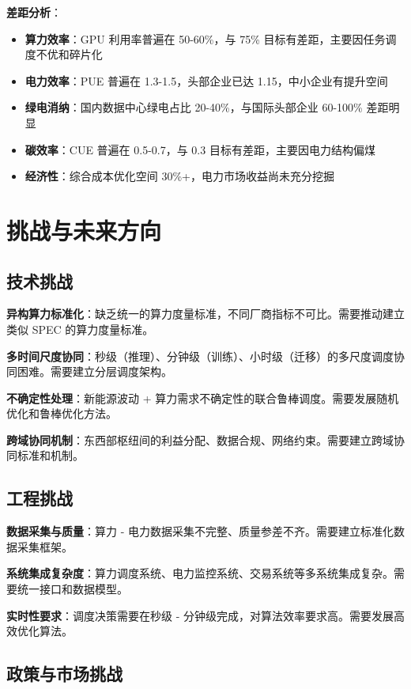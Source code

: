\documentclass[12pt,a4paper]{article}
\begin{document}
\textbf{差距分析}：
\begin{itemize}
    \item \textbf{算力效率}：GPU 利用率普遍在 50-60\%，与 75\% 目标有差距，主要因任务调度不优和碎片化
    \item \textbf{电力效率}：PUE 普遍在 1.3-1.5，头部企业已达 1.15，中小企业有提升空间
    \item \textbf{绿电消纳}：国内数据中心绿电占比 20-40\%，与国际头部企业 60-100\% 差距明显
    \item \textbf{碳效率}：CUE 普遍在 0.5-0.7，与 0.3 目标有差距，主要因电力结构偏煤
    \item \textbf{经济性}：综合成本优化空间 30\%+，电力市场收益尚未充分挖掘
\end{itemize}

\section{挑战与未来方向}
\label{sec:challenge}

\subsection{技术挑战}

\textbf{异构算力标准化}：缺乏统一的算力度量标准，不同厂商指标不可比。需要推动建立类似 SPEC 的算力度量标准。

\textbf{多时间尺度协同}：秒级（推理）、分钟级（训练）、小时级（迁移）的多尺度调度协同困难。需要建立分层调度架构。

\textbf{不确定性处理}：新能源波动 + 算力需求不确定性的联合鲁棒调度。需要发展随机优化和鲁棒优化方法。

\textbf{跨域协同机制}：东西部枢纽间的利益分配、数据合规、网络约束。需要建立跨域协同标准和机制。

\subsection{工程挑战}

\textbf{数据采集与质量}：算力 - 电力数据采集不完整、质量参差不齐。需要建立标准化数据采集框架。

\textbf{系统集成复杂度}：算力调度系统、电力监控系统、交易系统等多系统集成复杂。需要统一接口和数据模型。

\textbf{实时性要求}：调度决策需要在秒级 - 分钟级完成，对算法效率要求高。需要发展高效优化算法。

\subsection{政策与市场挑战}
\end{document}
